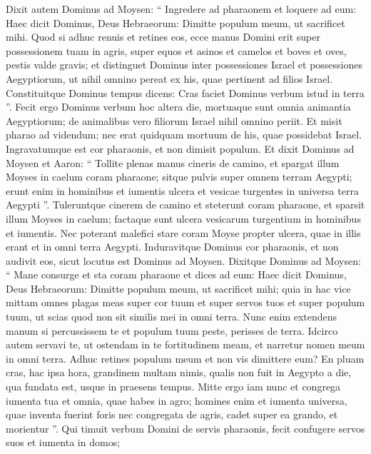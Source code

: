 \begin{biblechapter}
\begin{biblechapter}
\begin{biblechapter}
\begin{biblechapter}
\begin{biblechapter}
\begin{biblechapter}
\begin{biblechapter}
\begin{biblechapter}
\begin{biblechapter}
\verse Dixit autem Dominus ad Moysen: “ Ingredere ad pharaonem et loquere ad eum: Haec dicit Dominus, Deus Hebraeorum: Dimitte populum meum, ut sacrificet mihi. 
\verse Quod si adhuc renuis et retines eos, 
\verse ecce manus Domini erit super possessionem tuam in agris, super equos et asinos et camelos et boves et oves, pestis valde gravis; 
\verse et distinguet Dominus inter possessiones Israel et possessiones Aegyptiorum, ut nihil omnino pereat ex his, quae pertinent ad filios Israel. 
\verse Constituitque Dominus tempus dicens: Cras faciet Dominus verbum istud in terra ”.
 \verse Fecit ergo Dominus verbum hoc altera die, mortuaque sunt omnia animantia Aegyptiorum; de animalibus vero filiorum Israel nihil omnino periit. 
\verse Et misit pharao ad videndum; nec erat quidquam mortuum de his, quae possidebat Israel. Ingravatumque est cor pharaonis, et non dimisit populum.
 \verse Et dixit Dominus ad Moysen et Aaron: “ Tollite plenas manus cineris de camino, et spargat illum Moyses in caelum coram pharaone; 
\verse sitque pulvis super omnem terram Aegypti; erunt enim in hominibus et iumentis ulcera et vesicae turgentes in universa terra Aegypti ”.
 \verse Tuleruntque cinerem de camino et steterunt coram pharaone, et sparsit illum Moyses in caelum; factaque sunt ulcera vesicarum turgentium in hominibus et iumentis. 
\verse Nec poterant malefici stare coram Moyse propter ulcera, quae in illis erant et in omni terra Aegypti. 
\verse Induravitque Dominus cor pharaonis, et non audivit eos, sicut locutus est Dominus ad Moysen.
 \verse Dixitque Dominus ad Moysen: “ Mane consurge et sta coram pharaone et dices ad eum: Haec dicit Dominus, Deus Hebraeorum: Dimitte populum meum, ut sacrificet mihi; 
\verse quia in hac vice mittam omnes plagas meas super cor tuum et super servos tuos et super populum tuum, ut scias quod non sit similis mei in omni terra. 
\verse Nunc enim extendens manum si percussissem te et populum tuum peste, perisses de terra. 
\verse Idcirco autem servavi te, ut ostendam in te fortitudinem meam, et narretur nomen meum in omni terra. 
\verse Adhuc retines populum meum et non vis dimittere eum? 
\verse En pluam cras, hac ipsa hora, grandinem multam nimis, qualis non fuit in Aegypto a die, qua fundata est, usque in praesens tempus. 
\verse Mitte ergo iam nunc et congrega iumenta tua et omnia, quae habes in agro; homines enim et iumenta universa, quae inventa fuerint foris nec congregata de agris, cadet super ea grando, et morientur ”. 
\verse Qui timuit verbum Domini de servis pharaonis, fecit confugere servos suos et iumenta in domos; 

\end{biblechapter}
\end{biblechapter}
\end{biblechapter}
\end{biblechapter}
\end{biblechapter}
\end{biblechapter}
\end{biblechapter}
\end{biblechapter}
\end{biblechapter}
